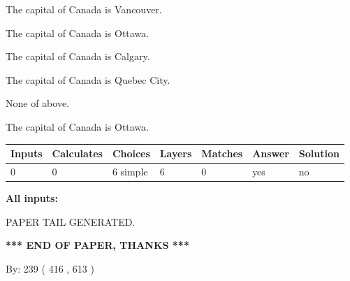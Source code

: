 \documentclass[12pt]{article}
\begin{document}
 
The capital of Canada is Vancouver.
 
 
The capital of Canada is Ottawa.
 
 
The capital of Canada is Calgary.
 
 
The capital of Canada is Quebec City.
 
 
 None of above.
 
 
\noindent{}
 
 
The capital of Canada is Ottawa.
 
 
\noindent{}
 
 
   
   
   
   
\noindent\begin{tabular}{|l|l|l|l|l|l|l|}
 \hline
Inputs & Calculates & Choices & Layers & Matches & Answer & Solution \\ \hline
 0  & 
 0  & 
 6
  simple  
  & 
 6  & 
 0  & 
  yes & 
  no 
  \\ \hline
 \end{tabular}
   
   
   
   
\noindent{}
   
   
   
   
\noindent\vspace{0.1in}\hspace{-0.08in} {\textbf{\Large{All inputs: }}}
   
   
   
   
   
   
 \vspace{0.2in}
 
   
   
\vspace{2.0in} PAPER TAIL GENERATED.
   
   
   
   
\vspace{1.0in} 
{\textbf{\large{ *** END OF PAPER, THANKS *** }}} 
   
   
\hspace{1.0in} By: 
 239 ( 416 ,  613 )
   
\end{document}
